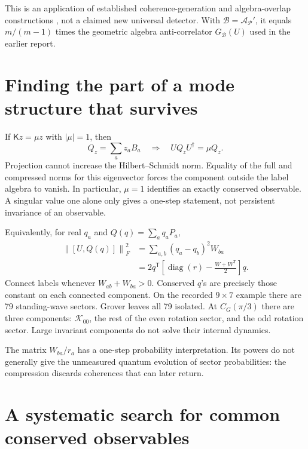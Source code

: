 \documentclass[11pt,a4paper,oneside]{report}
\newcommand{\diag}{\operatorname{diag}}
\newcommand{\norm}[1]{\left\lVert#1\right\rVert}
\numberwithin{equation}{chapter}
\begin{document}
This is an application of established coherence-generation and
algebra-overlap constructions \cite{cgp,alggeom,gaac}, not a claimed
new universal detector. With \(\mathcal B=\mathcal A_{\mathscr P}'\),
it equals \(m/(m-1)\) times the geometric algebra anti-correlator
\(G_{\mathcal B}(U)\) used in the earlier report.

\section{Finding the part of a mode structure that survives}

If \(\mathsf K z=\mu z\) with \(|\mu|=1\), then
\begin{equation}
Q_z=\sum_a z_aB_a\quad\Longrightarrow\quad
UQ_zU^\dagger=\mu Q_z.
\end{equation}
Projection cannot increase the Hilbert--Schmidt norm. Equality of
the full and compressed norms for this eigenvector forces the
component outside the label algebra to vanish. In particular,
\(\mu=1\) identifies an exactly conserved observable.
A singular value one alone only gives a one-step statement, not
persistent invariance of an observable.

Equivalently, for real \(q_a\) and \(Q(q)=\sum_aq_aP_a\),
\begin{align}
\norm{[U,Q(q)]}_F^2
&=\sum_{a,b}(q_a-q_b)^2W_{ba}\\
&=2q^{\mathsf T}
\left[\diag(r)-\frac{W+W^{\mathsf T}}2\right]q.
\end{align}
Connect labels whenever \(W_{ab}+W_{ba}>0\). Conserved \(q\)'s
are precisely those constant on each connected component. On the
recorded \(9\times7\) example there are 79 standing-wave sectors.
Grover leaves all 79 isolated. At \(C_G(\pi/3)\) there are three
components: \(\mathcal K_{00}\), the rest of the even rotation
sector, and the odd rotation sector. Large invariant components do
not solve their internal dynamics.

The matrix \(W_{ba}/r_a\) has a one-step probability interpretation.
Its powers do not generally give the unmeasured quantum evolution of
sector probabilities: the compression discards coherences that can
later return.

\section{A systematic search for common conserved observables}
\end{document}
